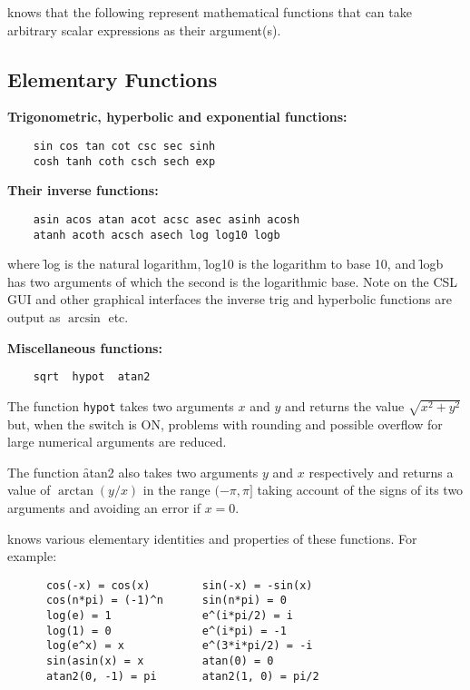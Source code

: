 {\REDUCE} knows that the following represent mathematical functions
 that can
take arbitrary scalar expressions as their argument(s).

\subsection{Elementary Functions}
\textbf{Trigonometric, hyperbolic and exponential functions:}
\begin{verbatim}
    sin cos tan cot csc sec sinh
    cosh tanh coth csch sech exp
\end{verbatim}

\textbf{Their inverse functions:}
\begin{verbatim}
    asin acos atan acot acsc asec asinh acosh
    atanh acoth acsch asech log log10 logb
\end{verbatim}
where \f{log} is the natural logarithm, \f{log10} is the logarithm to
base 10, and \f{logb} has two arguments of which the second is the
logarithmic base.  Note on the CSL GUI and other graphical interfaces
the inverse trig and hyperbolic functions are output as $\arcsin$ etc.

\textbf{Miscellaneous functions:}
\begin{verbatim}
    sqrt  hypot  atan2
\end{verbatim}
The function \texttt{hypot} takes two arguments $x$  and $y$ and
returns the value $\sqrt{x^2+y^2}$ but, when the switch  is ON,
problems with rounding and possible overflow for large numerical arguments
are reduced.

The function \f{atan2} also takes two arguments $y$ and $x$
respectively and returns a value of $\arctan(y/x)$ in the range
$(-\pi, \pi]$ taking account of the signs of its two arguments and
avoiding an error if $x=0$.

{\REDUCE} knows various elementary identities and properties
of these functions. For example:
\begin{verbatim}
      cos(-x) = cos(x)        sin(-x) = -sin(x)
      cos(n*pi) = (-1)^n      sin(n*pi) = 0
      log(e) = 1              e^(i*pi/2) = i
      log(1) = 0              e^(i*pi) = -1
      log(e^x) = x            e^(3*i*pi/2) = -i
      sin(asin(x) = x         atan(0) = 0
      atan2(0, -1) = pi       atan2(1, 0) = pi/2
\end{verbatim}

